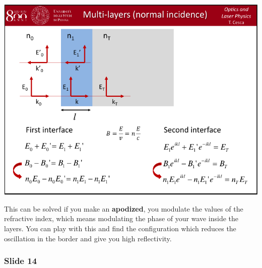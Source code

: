 \documentclass[../main/main.tex]{subfiles}
\begin{document}
\begin{minipage}[]{0.5\linewidth}
\centering
\includegraphics[page=13,width=1\textwidth]{../lessons/pdf_file/06_lecture.pdf}
\end{minipage}
\hspace{0.3cm}\vspace{0.3cm}
\begin{minipage}[c]{0.47\linewidth}

This can be solved if you make an \textbf{apodized}, you modulate the values of the refractive index, which means modulating the phase of your wave inside the layers. You can play with this and find the configuration which reduces the oscillation in the border and give you high reflectivity.

\end{minipage}

\subsubsection*{Slide 14}
\end{document}
